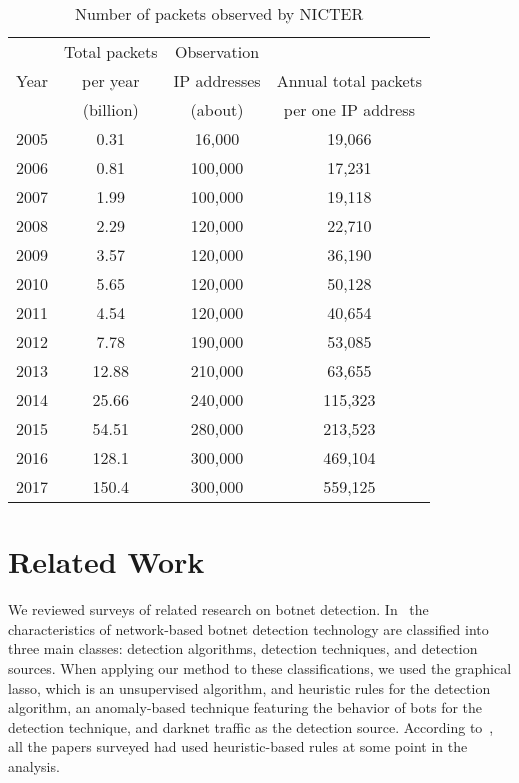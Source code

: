 \documentclass[letterpaper]{sig-alternate-10pt}
\begin{document}
\begin{table}[htb]
  \begin{center}
    \caption{Number of packets observed by NICTER}
    \begin{tabular}{cccc} \hline
       & Total packets & Observation & \\
      Year & per year & IP addresses & Annual total packets \\
       & (billion) & (about) & per one IP address \\ \hline \hline
      2005 & 0.31 & 16,000 & 19,066 \\
      2006 & 0.81 & 100,000 & 17,231 \\
      2007 & 1.99 & 100,000 & 19,118 \\
      2008 & 2.29 & 120,000 & 22,710 \\
      2009 & 3.57 & 120,000 & 36,190 \\
      2010 & 5.65 & 120,000 & 50,128 \\
      2011 & 4.54 & 120,000 & 40,654 \\
      2012 & 7.78 & 190,000 & 53,085 \\
      2013 & 12.88 & 210,000 & 63,655 \\
      2014 & 25.66 & 240,000 & 115,323 \\
      2015 & 54.51 & 280,000 & 213,523 \\
      2016 & 128.1 & 300,000 & 469,104 \\
      2017 & 150.4 & 300,000 & 559,125 \\ \hline
    \end{tabular}
    \label{tab:packet}
  \end{center}
\end{table}


\section{Related Work}
We reviewed surveys of related research on botnet detection.
In~\cite{Garcia} the characteristics of network-based botnet detection technology are classified into three main classes: detection algorithms, detection techniques, and detection sources.
When applying our method to these classifications, we used the graphical lasso, which is an unsupervised algorithm, and heuristic rules for the detection algorithm, an anomaly-based technique featuring the behavior of bots for the detection technique, and darknet traffic as the detection source.
According to~\cite{Garcia}, all the papers surveyed had used heuristic-based rules at some point in the analysis.
\end{document}
